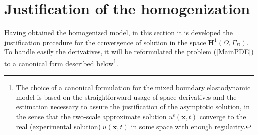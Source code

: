 \section{Justification of the homogenization}
Having obtained the homogenized model, in this section it is developed the justification procedure for the convergence of solution in the space $\mathbf{H}^1(\Omega, \Gamma_D)$. To handle easily the derivatives, it will be reformulated the problem (\ref{MainPDE}) to a canonical form described below\footnote{The choice of a canonical formulation for the mixed boundary elastodynamic model is based on the straightforward usage of space derivatives and the estimation necessary to assure the justification of the asymptotic solution, in the sense that the two-scale approximate solution $u^{\epsilon}(\mathbf{x},t)$ converge to the real (experimental solution) $u(\mathbf{x},t)$ in some space with enough regularity.}.

